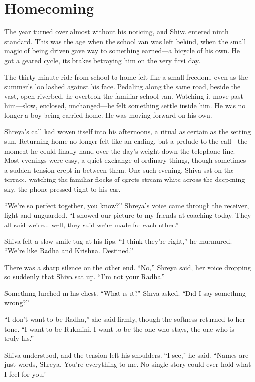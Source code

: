 \chapter{Homecoming}
The year turned over almost without his noticing, and Shiva entered ninth standard. This was the age when the school van was left behind, when the small magic of being driven gave way to something earned—a bicycle of his own. He got a geared cycle, its brakes betraying him on the very first day.

The thirty-minute ride from school to home felt like a small freedom, even as the summer's loo lashed against his face. Pedaling along the same road, beside the vast, open riverbed, he overtook the familiar school van. Watching it move past him—slow, enclosed, unchanged—he felt something settle inside him. He was no longer a boy being carried home. He was moving forward on his own.

Shreya's call had woven itself into his afternoons, a ritual as certain as the setting sun. Returning home no longer felt like an ending, but a prelude to the call—the moment he could finally hand over the day's weight down the telephone line. Most evenings were easy, a quiet exchange of ordinary things, though sometimes a sudden tension crept in between them. One such evening, Shiva sat on the terrace, watching the familiar flocks of egrets stream white across the deepening sky, the phone pressed tight to his ear.

``We're so perfect together, you know?'' Shreya's voice came through the receiver, light and unguarded. ``I showed our picture to my friends at coaching today. They all said we're... well, they said we're made for each other.''

Shiva felt a slow smile tug at his lips. ``I think they're right,'' he murmured. ``We're like Radha and Krishna. Destined.''

There was a sharp silence on the other end. ``No,'' Shreya said, her voice dropping so suddenly that Shiva sat up. ``I'm not your Radha.''

Something lurched in his chest. ``What is it?'' Shiva asked. ``Did I say something wrong?''

``I don't want to be Radha,'' she said firmly, though the softness returned to her tone. ``I want to be Rukmini. I want to be the one who stays, the one who is truly his.''

Shiva understood, and the tension left his shoulders. ``I see,'' he said. ``Names are just words, Shreya. You're everything to me. No single story could ever hold what I feel for you.''

